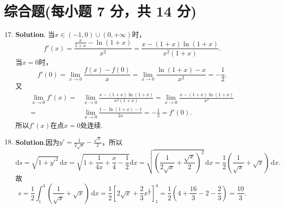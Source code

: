 \documentclass[../main.tex]{subfiles}
\begin{document}
\section{综合题(每小题 7 分，共 14 分)}
\begin{enumerate}
    \setcounter{enumi}{16}
    \item \textbf{Solution}. 当$x\in(-1,0)\cup(0,+\infty)$时，
          \[
              f'(x)=\frac{\frac{x}{1+x}-\ln(1+x)}{x^{2}}=\frac{x-(1+x)\ln(1+x)}{x^{2}(1+x)}.
          \]
          当$x=0$时，
          \[
              f'(0)=\lim_{x\to0}\frac{f(x)-f(0)}{x}=\lim_{x\to0}\frac{\ln(1+x)-x}{x^{2}}
              =-\frac{1}{2}.
          \]
          又
          \[
              \begin{aligned}
                  \lim_{x\to0}f'(x) = {} & \lim_{x\to0}\frac{x-(1+x)\ln(1+x)}{x^{2}(1+x)} = \lim_{x\to0}\frac{x-(1+x)\ln(1+x)}{x^{2}} \\
                  = {}                   & \lim_{x\to0}\frac{1-\ln(1+x)-1}{2x} = -\frac{1}{2} = f'(0).
              \end{aligned}
          \]
          所以$f'(x)$在点$x=0$处连续.

    \item \textbf{Solution}.因为$y'=\frac{1}{2\sqrt{x}}-\frac{\sqrt{x}}{2}$，所以
          \[
              \mathrm{d}s=\sqrt{1+y'^{2}}\,\mathrm{d}x=\sqrt{1+\frac{1}{4x}+\frac{x}{4}-\frac{1}{2}}
              \mathrm{d}x=\sqrt{\left(\frac{1}{2\sqrt{x}}+\frac{\sqrt{x}}{2}\right)^{2}}\,\mathrm{d}
              x=\frac{1}{2}\left(\frac{1}{\sqrt{x}}+\sqrt{x}\right)\,\mathrm{d}x.
          \]
          故
          \[
              s=\frac{1}{2}\int_{1}^{4}\left(\frac{1}{\sqrt{x}}+\sqrt{x}\right)\,\mathrm{d}
              x=\frac{1}{2}\left[2\sqrt{x}+\frac{2}{3}x^{\frac{3}{2}}\right]_{1}^{4}=\frac{1}{2}
              \left(4+\frac{16}{3}-2-\frac{2}{3}\right)=\frac{10}{3}.
          \]
\end{enumerate}
\end{document}
